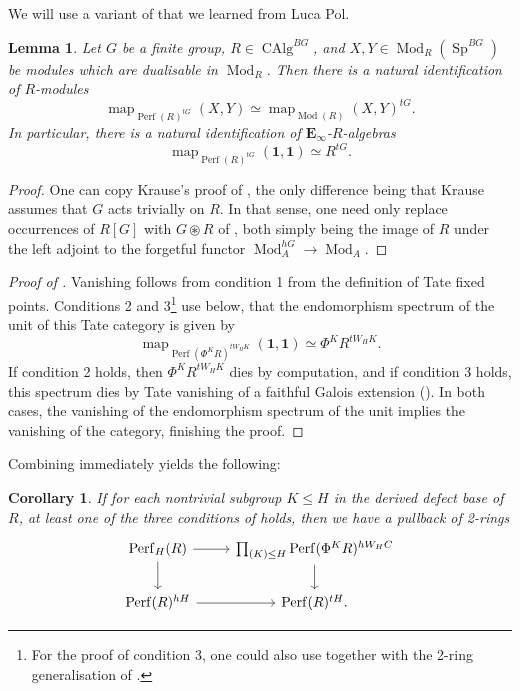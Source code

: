 \documentclass[11pt, a4paper]{article}
\newcommand{\1}{\mathbf{1}}
\DeclareMathOperator{\CAlg}{CAlg}
\DeclareMathOperator{\map}{map}
\DeclareMathOperator{\Mod}{Mod}
\DeclareMathOperator{\Perf}{Perf}
\DeclareMathOperator{\Sp}{Sp}
\newcommand{\E}{\mathbf{E}}
\theoremstyle{plain}
\newtheorem{lemma}[equation]{Lemma}
\newtheorem{cor}[equation]{Corollary}
\theoremstyle{definition}
\theoremstyle{remark}\numberwithin{equation}{section}
\begin{document}
We will use a variant of \cite[Lm.4.2]{krause_equivariantpicard} that we learned from Luca Pol.

\begin{lemma}\label{lm:42_krause_generalised}
    Let $G$ be a finite group, $R \in \CAlg^{BG}$, and $X,Y\in \Mod_R(\Sp^{BG})$ be modules which are dualisable in $\Mod_R$. Then there is a natural identification of $R$-modules
    \[\map_{\Perf(R)^{tG}}(X,Y) \simeq \map_{\Mod(R)}(X,Y)^{tG}.\]
    In particular, there is a natural identification of $\E_\infty$-$R$-algebras
    \[\map_{\Perf(R)^{tG}}(\1,\1) \simeq R^{tG}.\]
\end{lemma}

\begin{proof}
    One can copy Krause's proof of \cite[Lm.4.2]{krause_equivariantpicard}, the only difference being that Krause assumes that $G$ acts trivially on $R$. In that sense, one need only replace occurrences of $R[G]$ with $G \circledast R$ of \cite[Not.6.8]{NPR2024}, both simply being the image of $R$ under the left adjoint to the forgetful functor $\Mod_A^{hG} \to \Mod_A$.
\end{proof}

\begin{proof}[Proof of ]
    Vanishing follows from condition 1 from the definition of Tate fixed points. Conditions 2 and 3\footnote{For the proof of condition 3, one could also use  together with the 2-ring generalisation of \cite[Pr.6.3.3]{johnrognessdualisinggorups}.} use  below, that the endomorphism spectrum of the unit of this Tate category is given by
    \[\map_{\Perf(\Phi^K R)^{tW_H K}}(\1,\1) \simeq \Phi^K R^{tW_H K}.\]
    If condition 2 holds, then $\Phi^K R^{tW_H K}$ dies by computation, and if condition 3 holds, this spectrum dies by Tate vanishing of a faithful Galois extension (\cite[Pr.6.3.3]{johnrognessdualisinggorups}). In both cases, the vanishing of the endomorphism spectrum of the unit implies the vanishing of the category, finishing the proof.
\end{proof}

Combining  immediately yields the following:

\begin{cor}\label{cor:generic_decomposition}
    If for each nontrivial subgroup $K\leq H$ in the derived defect base of $R$, at least one of the three conditions of  holds, then we have a pullback of 2-rings
    \[\begin{tikzcd}
        {\Perf_H(R)}\ar[r]\ar[d]    &   {\prod_{(K)\leq H} \Perf(\Phi^K R)^{hW_H C}}\ar[d]  \\
        {\Perf(R)^{hH}}\ar[r]   &   {\Perf(R)^{tH}.}
    \end{tikzcd}\]
\end{cor}
\end{document}
